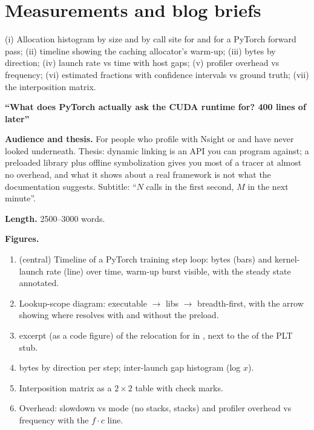 \section{Measurements and blog briefs}

(i) Allocation histogram by size and by call site for  and for a PyTorch forward pass; (ii)  timeline showing the caching allocator's warm-up; (iii)  bytes by direction; (iv) launch rate vs time with host gaps; (v) profiler overhead vs frequency; (vi) estimated fractions with confidence intervals vs ground truth; (vii) the interposition matrix.

\begin{blogbox}
 \textbf{``What does PyTorch actually ask the CUDA runtime for? 400 lines of  later''}

\textbf{Audience and thesis.} For people who profile with Nsight or  and have never looked underneath. Thesis: dynamic linking is an API you can program against; a preloaded library plus offline symbolization gives you most of a tracer at almost no overhead, and what it shows about a real framework is not what the documentation suggests. Subtitle: ``$N$  calls in the first second, $M$ in the next minute''.

\textbf{Length.} 2500--3000 words.

\textbf{Figures.}
\begin{enumerate}
  \item {} (central) Timeline of a PyTorch training step loop:  bytes (bars) and kernel-launch rate (line) over time, warm-up burst visible, with the steady state annotated.
  \item {} Lookup-scope diagram: executable $\to$  libs $\to$  breadth-first, with the arrow showing where  resolves with and without the preload.
  \item {}  excerpt (as a code figure) of the  relocation for  in , next to the  of the PLT stub.
  \item {}  bytes by direction per step; inter-launch gap histogram (log $x$).
  \item {} Interposition matrix as a $2\times 2$ table with check marks.
  \item {} Overhead: slowdown vs mode (no stacks, stacks) and profiler overhead vs frequency with the $f\cdot c$ line.
\end{enumerate}


\end{blogbox}
